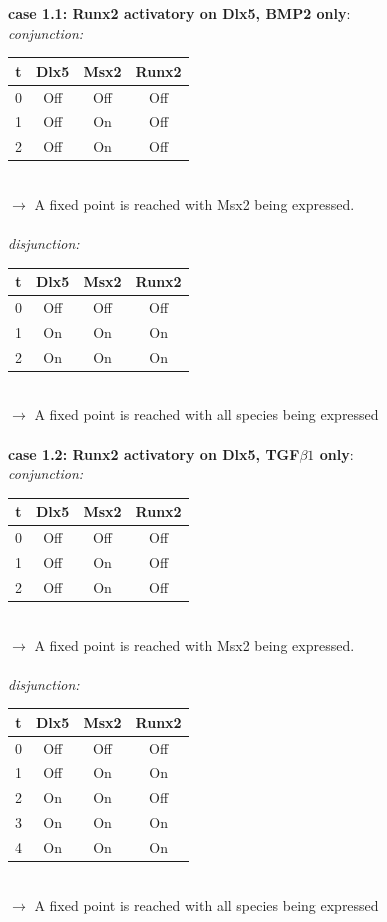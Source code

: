 \documentclass[11pt]{article}
\begin{document}
\begin{appendices}
\textbf{case 1.1: Runx2 activatory on Dlx5, BMP2 only}: \\
\textit{conjunction:}
\\
\begin{tabular}{c c c c}
t & Dlx5 & Msx2 & Runx2 \\
\hline
0 & Off & Off & Off \\
1 & Off & On & Off \\
2 & Off & On & Off
\end{tabular}
\\
$\rightarrow$ A fixed point is reached with Msx2 being expressed.  
\\ \\
\textit{disjunction:}
\\ 
\begin{tabular}{c c c c}
t & Dlx5 & Msx2 & Runx2 \\
\hline
0 & Off & Off & Off \\
1 & On & On & On \\
2 & On & On & On
\end{tabular}
\\
$\rightarrow$ A fixed point is reached with all species being expressed
\\ \\
\textbf{case 1.2: Runx2 activatory on Dlx5, TGF$\beta1$ only}: \\
\textit{conjunction:}
\\ 
\begin{tabular}{c c c c}
t & Dlx5 & Msx2 & Runx2 \\
\hline
0 & Off & Off & Off \\
1 & Off & On & Off \\
2 & Off & On & Off
\end{tabular}
\\
$\rightarrow$ A fixed point is reached with Msx2 being expressed.  
\\ \\
\textit{disjunction:}
\\ 
\begin{tabular}{c c c c}
t & Dlx5 & Msx2 & Runx2 \\
\hline
0 & Off & Off & Off \\
1 & Off & On & On \\
2 & On & On & Off \\
3 & On & On & On \\
4 & On & On & On
\end{tabular}
\\
$\rightarrow$ A fixed point is reached with all species being expressed

\end{appendices}
\end{document}
